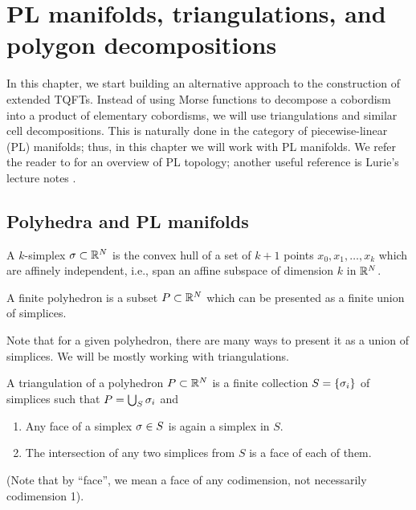 \chapter{PL manifolds, triangulations, and polygon decompositions}\label{c:PL}

In this chapter, we start building an alternative approach to the construction
of extended TQFTs. Instead of using Morse functions to decompose a cobordism
into a product of elementary cobordisms, we will use triangulations and similar
cell decompositions. This is naturally done in the category of piecewise-linear
(PL) manifolds; thus, in this chapter we will work with PL manifolds. We refer
the reader to  for an overview of PL topology; another useful
reference is Lurie's lecture notes .

\section{Polyhedra and PL manifolds}\label{s:polyhedra-pl}
\begin{definition}
  A $k$-simplex $\sigma\subset \mathbb{R}^N$ is the convex hull of a set of $k+1$ points
  $x_0, x_1, \dots, x_k$ which are affinely independent, i.e., span an affine
  subspace of dimension $k$ in $\mathbb{R}^N$.

  A finite polyhedron is a subset $P\subset \mathbb{R}^N$ which can be presented as a
  finite union of simplices.
\end{definition}
Note that for a given polyhedron, there are many ways to present it as a union
of simplices. We will be mostly working with triangulations.

\begin{definition}\label{d:triangulation}
  A triangulation of a polyhedron $P\subset \mathbb{R}^N$ is a finite
  collection $S=\{\sigma_i\}$ of simplices such that $P=\bigcup_S \sigma_i$
  and
  \begin{enumerate}
    \item Any face of a simplex $\sigma\in S$ is again a simplex in $S$.
    \item The intersection of any two simplices from $S$ is a face of each of them.
  \end{enumerate}
\end{definition}
(Note that by ``face'', we mean a face of any codimension, not necessarily
 codimension 1).

